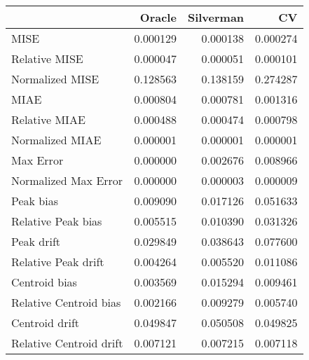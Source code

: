 \begin{tabular}{lrrr}
  \hline
 & Oracle & Silverman & CV \\ 
  \hline
MISE & 0.000129 & 0.000138 & 0.000274 \\ 
  Relative MISE & 0.000047 & 0.000051 & 0.000101 \\ 
  Normalized MISE & 0.128563 & 0.138159 & 0.274287 \\ 
  MIAE & 0.000804 & 0.000781 & 0.001316 \\ 
  Relative MIAE & 0.000488 & 0.000474 & 0.000798 \\ 
  Normalized MIAE & 0.000001 & 0.000001 & 0.000001 \\ 
  Max Error & 0.000000 & 0.002676 & 0.008966 \\ 
  Normalized Max Error & 0.000000 & 0.000003 & 0.000009 \\ 
  Peak bias & 0.009090 & 0.017126 & 0.051633 \\ 
  Relative Peak bias & 0.005515 & 0.010390 & 0.031326 \\ 
  Peak drift & 0.029849 & 0.038643 & 0.077600 \\ 
  Relative Peak drift & 0.004264 & 0.005520 & 0.011086 \\ 
  Centroid bias & 0.003569 & 0.015294 & 0.009461 \\ 
  Relative Centroid bias & 0.002166 & 0.009279 & 0.005740 \\ 
  Centroid drift & 0.049847 & 0.050508 & 0.049825 \\ 
  Relative Centroid drift & 0.007121 & 0.007215 & 0.007118 \\ 
   \hline
\end{tabular}
